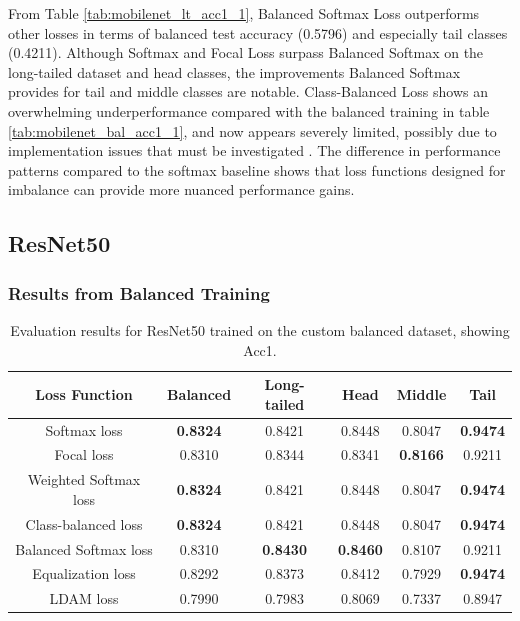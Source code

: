 From Table \ref{tab:mobilenet_lt_acc1_1}, Balanced Softmax Loss outperforms other losses in terms of balanced test accuracy (0.5796) and especially tail classes (0.4211). Although Softmax and Focal Loss surpass Balanced Softmax on the long-tailed dataset and head classes, the improvements Balanced Softmax provides for tail and middle classes are notable. Class-Balanced Loss shows an overwhelming underperformance compared with the balanced training in table \ref{tab:mobilenet_bal_acc1_1}, and now appears severely limited, possibly due to implementation issues that must be investigated . The difference in performance patterns compared to the softmax baseline shows that loss functions designed for imbalance can provide more nuanced performance gains.

\subsection{ResNet50}

\subsubsection{Results from Balanced Training}

\begin{table}[H]
    \centering
    \caption{Evaluation results for ResNet50 trained on the custom balanced dataset, showing Acc1.}
    \begin{tabular}{cccccc}
        \toprule
        Loss Function & Balanced & Long-tailed & Head & Middle & Tail \\ 
        \midrule
        Softmax loss   & \textbf{0.8324}  & 0.8421 & 0.8448 & 0.8047 & \textbf{0.9474} \\
        Focal loss   & 0.8310  & 0.8344 & 0.8341 & \textbf{0.8166} & 0.9211 \\
        Weighted Softmax loss   & \textbf{0.8324} & 0.8421 & 0.8448 & 0.8047 & \textbf{0.9474} \\
        Class-balanced loss   &  \textbf{0.8324} & 0.8421 & 0.8448 & 0.8047 & \textbf{0.9474} \\
        Balanced Softmax loss   & 0.8310 & \textbf{0.8430} & \textbf{0.8460} & 0.8107 & 0.9211 \\
        Equalization loss   & 0.8292 & 0.8373 & 0.8412 & 0.7929 & \textbf{0.9474} \\
        LDAM loss   & 0.7990 & 0.7983 & 0.8069 & 0.7337 & 0.8947 \\
        \bottomrule
    \end{tabular}
    \label{tab:resnet_bal_acc1_1}
\end{table}

